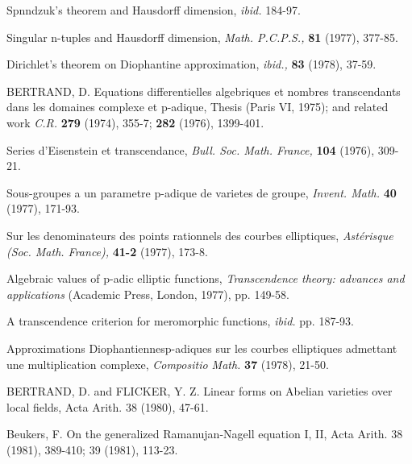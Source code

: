 \begin{hanglist}
    \item \hspace{1.5em} Spnndzuk's theorem and Hausdorff dimension, \textit{ibid.} 184-97.
    \item \hspace{1.5em} Singular n-tuples and Hausdorff dimension, \textit{Math. P.C.P.S.,} \textbf{81} (1977), 377-85.
    \item \hspace{1.5em} Dirichlet's theorem on Diophantine approximation, \textit{ibid.,} \textbf{83} (1978), 37-59.
    \item BERTRAND, D. Equations differentielles algebriques et nombres transcendants dans les domaines complexe et p-adique, Thesis (Paris VI, 1975); and related work \textit{C.R.} \textbf{279} (1974), 355-7; \textbf{282} (1976), 1399-401.
    \item \hspace{1.5em} Series d'Eisenstein et transcendance, \textit{Bull. Soc. Math. France,} \textbf{104} (1976), 309-21.
    \item \hspace{1.5em} Sous-groupes a un parametre p-adique de varietes de groupe, \textit{Invent. Math.} \textbf{40} (1977), 171-93.
    \item \hspace{1.5em} Sur les denominateurs des points rationnels des courbes elliptiques, \textit{Ast\'{e}risque (Soc. Math. France),} \textbf{41-2} (1977), 173-8.
    \item \hspace{1.5em} Algebraic values of p-adic elliptic functions, \textit{Transcendence theory: advances and applications} (Academic Press, London, 1977), pp. 149-58.
    \item \hspace{1.5em} A transcendence criterion for meromorphic functions, \textit{ibid.} pp. 187-93.
    \item \hspace{1.5em} Approximations Diophantiennesp-adiques sur les courbes elliptiques admettant une multiplication complexe, \textit{Compositio Math.} \textbf{37} (1978), 21-50.
    \item BERTRAND, D. and FLICKER, Y. Z. Linear forms on Abelian varieties over local fields, Acta Arith. 38 (1980), 47-61.
    \item Beukers, F. On the generalized Ramanujan-Nagell equation I, II, Acta Arith. 38 (1981), 389-410; 39 (1981), 113-23.

\end{hanglist}
